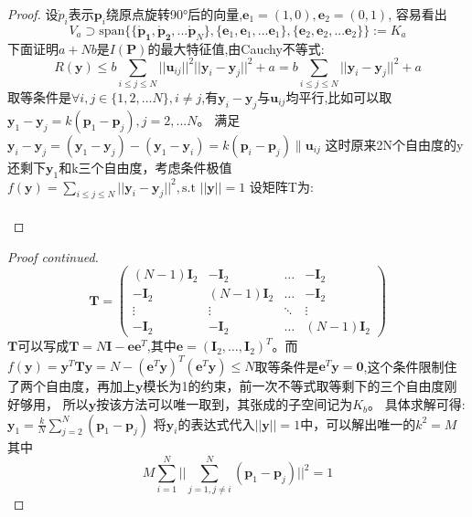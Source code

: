 \begin{proof}
设$\mathring{p}_i$表示$\bm{p}_i$绕原点旋转90°后的向量,$\bm{e}_1=(1,0),\bm{e}_2=(0,1)$,
容易看出
\[
V_a \supset\text{span}\{\{\bm{\mathring{p}_1},\bm{\mathring{p}_2},...\bm{\mathring{p}} _N\},\{\bm{e}_1,\bm{e}_1,...\bm{e}_1\},\{\bm{e}_2,\bm{e}_2,...\bm{e}_2\}\}:=K_a
\]
下面证明$a+Nb$是$I(\bm{P})$的最大特征值,由Cauchy不等式:
\begin{equation}
R(\bm{y})\leq b\sum_{i\leq j\leq N} ||\bm{u}_{ij}||^2||\bm{y}_i-\bm{y}_j||^2+a=b\sum_{i\leq j\leq N}||\bm{y}_i-\bm{y}_j||^2+a
\end{equation}
取等条件是$\forall i,j\in \{1,2,...N\},i\neq j$,有$\bm{y}_i-\bm{y}_j$与$\bm{u}_{ij}$均平行,比如可以取
$\bm{y}_1-\bm{y}_j=k(\bm{p}_1-\bm{p}_j),j=2,...N$。
满足
$\bm{y}_i-\bm{y}_j=(\bm{y}_1-\bm{y}_j)-(\bm{y}_1-\bm{y}_i)
=k(\bm{p}_i-\bm{p}_j)\parallel \bm{u}_{ij}$
这时原来2N个自由度的y还剩下$\bm{y}_1$和k三个自由度，考虑条件极值
$f(\bm{y})=\sum_{i\leq j\leq N} ||\bm{y}_i-\bm{y}_j||^2,\text{s.t } ||\bm{y}||=1$
设矩阵T为:
\\
\qquad\\
\end{proof}


\begin{proof}[Proof continued]
\[
\bm{T}=\left(
\begin{array}{cccc}
(N-1)\bm{I}_2&-\bm{I}_2&\dots&-\bm{I}_2\\
-\bm{I}_2&(N-1)\bm{I}_2&\dots&-\bm{I}_2\\
\vdots & \vdots & \ddots & \vdots\\
-\bm{I}_2& -\bm{I}_2 & \dots & (N-1)\bm{I}_2
\end{array}
\right)
\]
$\bm{T}$可以写成$\bm{T}=N\bm{I}-\bm{e}\bm{e}^T$,其中$\bm{e}=(\bm{I}_2,\dots,\bm{I}_2)^T$。而$f(\bm{y})=\bm{y}^T\bm{T}\bm{y}=N-(\bm{e}^T\bm{y})^T(\bm{e}^T\bm{y})\leq N$取等条件是$\bm{e}^T\bm{y}=\bm{0}$,这个条件限制住了两个自由度，再加上$\bm{y}$模长为1的约束，前一次不等式取等剩下的三个自由度刚好够用，
所以$\bm{y}$按该方法可以唯一取到，其张成的子空间记为$K_b$。
具体求解可得:
$\bm{y}_1=\frac{k}{N}\sum_{j=2}^N (\bm{p}_1-\bm{p}_j)$
将$\bm{y}_i$的表达式代入$||\bm{y}||=1$中，可以解出唯一的$k^2=M$
其中
\vspace{-2mm}
\[
M\sum_{i=1}^N||\sum_{j=1,j\neq i}^N(\bm{p}_1-\bm{p}_j)||^2=1
\]
\end{proof}


